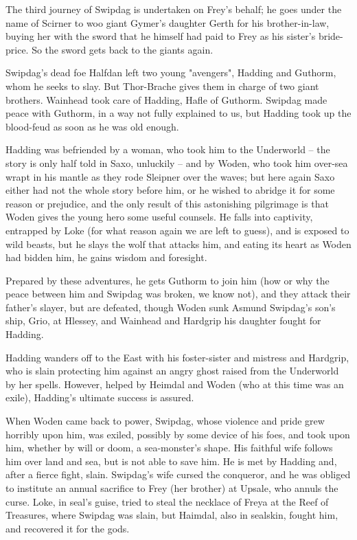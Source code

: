 \documentclass[10pt,a4paper]{report}
\begin{document}
The third journey of Swipdag is undertaken on Frey's behalf; he goes under the name of Scirner to woo giant Gymer's daughter Gerth for his brother-in-law, buying her with the sword that he himself had paid to Frey as his sister's bride-price. So the sword gets back to the giants again.

Swipdag's dead foe Halfdan left two young "avengers", Hadding and Guthorm, whom he seeks to slay. But Thor-Brache gives them in charge of two giant brothers. Wainhead took care of Hadding, Hafle of Guthorm. Swipdag made peace with Guthorm, in a way not fully explained to us, but Hadding took up the blood-feud as soon as he was old enough.

Hadding was befriended by a woman, who took him to the Underworld -- the story is only half told in Saxo, unluckily -- and by Woden, who took him over-sea wrapt in his mantle as they rode Sleipner over the waves; but here again Saxo either had not the whole story before him, or he wished to abridge it for some reason or prejudice, and the only result of this astonishing pilgrimage is that Woden gives the young hero some useful counsels. He falls into captivity, entrapped by Loke (for what reason again we are left to guess), and is exposed to wild beasts, but he slays the wolf that attacks him, and eating its heart as Woden had bidden him, he gains wisdom and foresight.

Prepared by these adventures, he gets Guthorm to join him (how or why the peace between him and Swipdag was broken, we know not), and they attack their father's slayer, but are defeated, though Woden sunk Asmund Swipdag's son's ship, Grio, at Hlessey, and Wainhead and Hardgrip his daughter fought for Hadding.

Hadding wanders off to the East with his foster-sister and mistress and Hardgrip, who is slain protecting him against an angry ghost raised from the Underworld by her spells. However, helped by Heimdal and Woden (who at this time was an exile), Hadding's ultimate success is assured.

When Woden came back to power, Swipdag, whose violence and pride grew horribly upon him, was exiled, possibly by some device of his foes, and took upon him, whether by will or doom, a sea-monster's shape. His faithful wife follows him over land and sea, but is not able to save him. He is met by Hadding and, after a fierce fight, slain. Swipdag's wife cursed the conqueror, and he was obliged to institute an annual sacrifice to Frey (her brother) at Upsale, who annuls the curse. Loke, in seal's guise, tried to steal the necklace of Freya at the Reef of Treasures, where Swipdag was slain, but Haimdal, also in sealskin, fought him, and recovered it for the gods.
\end{document}

